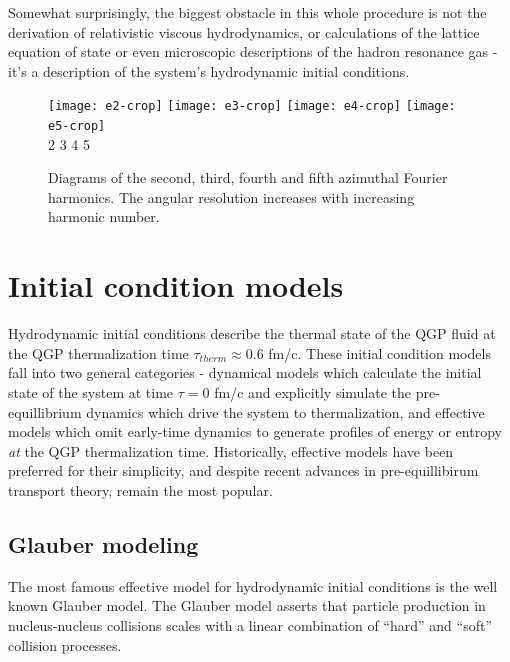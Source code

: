 \documentclass[aps,prc,reprint,amsmath,nofootinbib]{revtex4-1}
\begin{document}
Somewhat surprisingly, the biggest obstacle in this whole procedure is not the derivation of relativistic viscous hydrodynamics, or calculations of the lattice equation
of state or even microscopic descriptions of the hadron resonance gas - it's a description of the system's hydrodynamic initial conditions. 

\begin{figure}[t]
 \texttt{[image: e2-crop]} \hspace{.01\columnwidth} 
 \texttt{[image: e3-crop]} \hspace{.01\columnwidth}
 \texttt{[image: e4-crop]} \hspace{.01\columnwidth}
 \texttt{[image: e5-crop]}\\
 \flushleft
 \vspace{-0.1in}
 \hspace{0.08\columnwidth} 2 \hspace{0.19\columnwidth} 3 \hspace{0.21\columnwidth} 4 \hspace{0.22\columnwidth} 5
 \caption{\label{fig:harmonics} Diagrams of the second, third, fourth and fifth azimuthal Fourier harmonics. The angular resolution increases with increasing harmonic number.}
\end{figure}

\section{Initial condition models}

Hydrodynamic initial conditions describe the thermal state of the QGP fluid at the QGP thermalization time $\tau_{therm} \approx 0.6$ fm/c. These initial condition models
fall into two general categories - dynamical models which calculate the initial state of the system at time $\tau=0$ fm/c and explicitly simulate the pre-equillibrium 
dynamics which drive the system to thermalization, and effective models which omit early-time dynamics to generate profiles of energy or entropy \emph{at} the QGP thermalization time. 
Historically, effective models have been preferred for their simplicity, and despite recent advances in pre-equillibirum transport theory, remain the most popular.

\subsection{Glauber modeling}

The most famous effective model for hydrodynamic initial conditions is the well known Glauber model. The Glauber model asserts that particle production in nucleus-nucleus 
collisions scales with a linear combination of ``hard'' and ``soft'' collision processes. 
\end{document}
